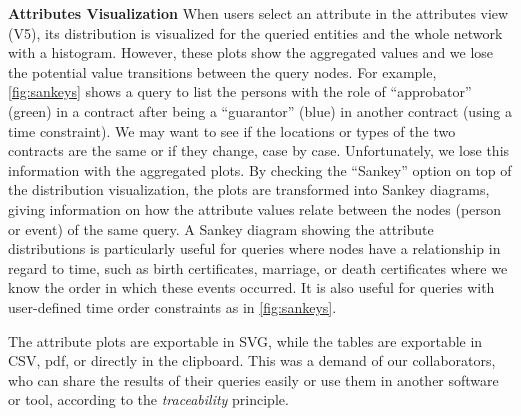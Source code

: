 \noindent\textbf{Attributes Visualization} When users select an attribute in the attributes view (V5), its distribution is visualized for the queried entities and the whole network with a histogram.
However, these plots show the aggregated values and we lose the potential value transitions between the query nodes.
For example, \autoref{fig:sankeys} shows a query to list the persons with the role of ``approbator'' (green) in a contract after being a ``guarantor'' (blue) in another contract (using a time constraint).
We may want to see if the locations or types of the two contracts are the same or if they change, case by case.
Unfortunately, we lose this information with the aggregated plots.
By checking the ``Sankey'' option on top of the distribution visualization, the plots are transformed into Sankey diagrams, giving information on how the attribute values relate between the nodes (person or event) of the same query.
A Sankey diagram showing the attribute distributions is particularly useful for queries where nodes have a relationship in regard to time, such as birth certificates, marriage, or death certificates where we know the order in which these events occurred.
It is also useful for queries with user-defined time order constraints as in \autoref{fig:sankeys}.

The attribute plots are exportable in SVG, while the tables are exportable in CSV, pdf, or directly in the clipboard.
This was a demand of our collaborators, who can share the results of their queries easily or use them in another software or tool, according to the \emph{traceability} principle.

